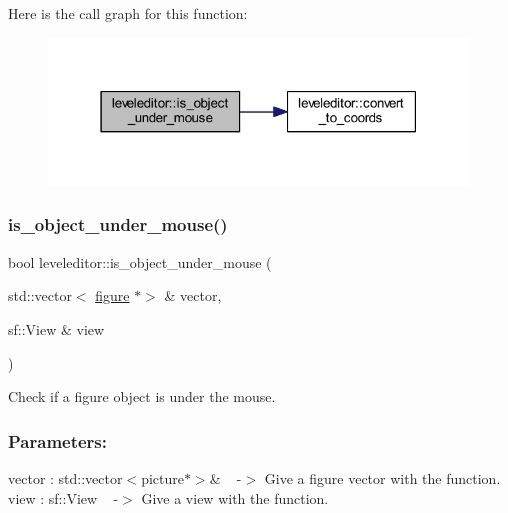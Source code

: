 Here is the call graph for this function\+:
\nopagebreak
\begin{figure}[H]
\begin{center}
\leavevmode
\includegraphics[width=316pt]{classleveleditor_a0c983ad2887a677d22fbea4eed0ec7d4_cgraph}
\end{center}
\end{figure}
\mbox{\label{classleveleditor_af11cad8cf1e7999a04f6a8f2a4950794}} 
\subsubsection{\texorpdfstring{is\+\_\+object\+\_\+under\+\_\+mouse()}{is\_object\_under\_mouse()}\hspace{0.1cm}{\footnotesize\ttfamily [2/2]}}
{\footnotesize\ttfamily bool leveleditor\+::is\+\_\+object\+\_\+under\+\_\+mouse (\begin{DoxyParamCaption}\item[{std\+::vector$<$ \hyperlink{classfigure}{figure} $\ast$$>$ \&}]{vector,  }\item[{sf\+::\+View \&}]{view }\end{DoxyParamCaption})\hspace{0.3cm}{\ttfamily [private]}}



Check if a figure object is under the mouse. 

\subsubsection*{Parameters\+: }

vector \+: std\+::vector$<$picture$\ast$$>$\& ~\newline
-\/$>$ Give a figure vector with the function. ~\newline
 view \+: sf\+::\+View ~\newline
-\/$>$ Give a view with the function. ~\newline


